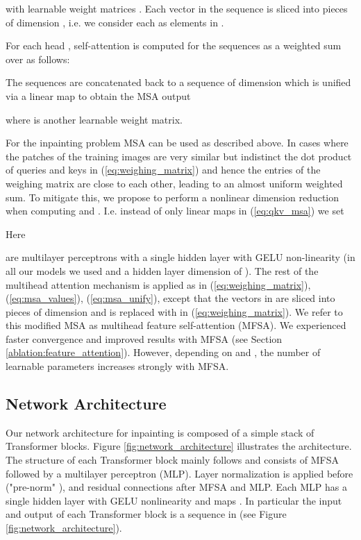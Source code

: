 \documentclass[final,5p,times,twocolumn]{elsarticle}
\begin{document}
	with learnable weight matrices . Each vector in the sequence  is sliced into  pieces of
	dimension , i.e. we consider each  as elements in .
	
	For each head , self-attention is computed for the sequences  as a weighted sum over  as follows:
	
	
	
	The sequences  are concatenated back to a sequence of dimension  which is unified via a linear map to obtain the MSA output
	
	where  is another learnable weight matrix.
	
	For the inpainting problem MSA can be used as described above. In cases where the patches of the training images are very similar but indistinct the dot product of queries and keys in (\ref{eq:weighing_matrix}) and hence the entries of the weighing matrix  are close to each other, leading to an almost uniform weighted sum. To mitigate this, we propose to perform a nonlinear dimension reduction when computing  and . I.e. instead of only linear maps in (\ref{eq:qkv_msa}) we set
	
	Here
	
	are multilayer perceptrons with a single hidden layer with GELU non-linearity (in all our models we used  and a hidden layer dimension of ). The rest of the multihead attention mechanism is applied as in (\ref{eq:weighing_matrix}), (\ref{eq:msa_values}), (\ref{eq:msa_unify}), except that the vectors in  are sliced into  pieces of dimension  and  is replaced with  in (\ref{eq:weighing_matrix}). We refer to this modified MSA as multihead feature self-attention (MFSA). We experienced faster convergence and improved results with MFSA (see Section \ref{ablation:feature_attention}). However, depending on  and , the number of learnable parameters increases strongly with MFSA.
	
	\subsection{Network Architecture}
	
	Our network architecture for inpainting is composed of a simple stack of  Transformer blocks. Figure \ref{fig:network_architecture} illustrates the architecture. The structure of each Transformer block mainly follows \cite{dosovitskiy2020} and consists of MFSA followed by a multilayer perceptron (MLP). Layer normalization is applied before ("pre-norm" \cite{Wang2019LearningDT}), and residual connections after MFSA and MLP. Each MLP has a single hidden layer with GELU nonlinearity and maps . In particular the input and output of each Transformer block is a sequence in  (see Figure \ref{fig:network_architecture}). 
	
\end{document}
